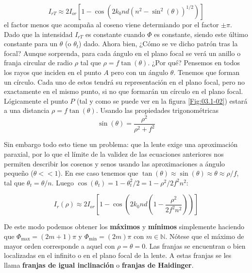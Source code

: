 \documentclass[12pt,a4paper]{book}
\numberwithin{equation}{section}
\numberwithin{figure}{section}
\newcommand{\parentesis}[1]{\left( #1  \right)}
\newcommand{\ccorchetes}[1]{\left[ #1  \right]}
\newcommand{\1}{_{(1)}}
\newcommand{\2}{_{(2)}}
\theoremstyle{definition}
\begin{document}
\begin{equation}
I_{rT} \approx 2I_{or} \ccorchetes{1-\cos \parentesis{2k_0 n d (n^2-\sin^2(\theta))^{1/2}}} \label{Ec:03.1-4}
\end{equation}
el factor menos que acompaña al coseno viene determiando por el factor $\pm \pi$. Dado que la intensidad $I_{rT}$ es constante cuando $\Phi$ es constante, siendo este último constante para un $\theta$ (o $\theta_t$) dado. Ahora bien, ¿Cómo se ve dicho patrón tras la focal? Aunque sorprenda, para cada ángulo en el plano focal se verá un anillo o franja circular de radio $\rho$ tal que $\rho =  f \tan (\theta)$. ¿Por qué? Pensemos en todos los rayos que inciden en el punto $A$ pero con un ángulo $\theta$. Tenemos que forman un círculo. Cada uno de estos tendrá su representación en el plano focal, pero no exactamente en el mismo punto, si no que formarán un círculo en el plano focal. Lógicamente el punto $P$ (tal y como se puede ver en la figura \ref{Fig:03.1-02}) estará a una distancia $\rho=f\tan(\theta)$. Usando las propiedades trigonométricas \\

\begin{equation}
\sin (\theta) = \frac{\rho^2}{\rho^2 + f^2}
\end{equation}


Sin embargo todo esto tiene un problema: que la lente exige una aproximación paraxial, por lo que el límite de la validez de las ecuaciones anteriores nos permiten describir los cosenos y senos usando las aproximaciones a ángulo pequeño ($\theta<<1$). En ese caso tenemos que $\tan(\theta) \approx \sin (\theta) \approx \theta \approx \rho/f$, tal que $\theta_t = \theta/n$. Luego $\cos (\theta_t) = 1-\theta_t^2/2 = 1 - \rho^2 / 2 f^2 n^2$:

\begin{equation}
I_{r} (\rho) \approx 2 I_{or} \ccorchetes{1- \cos \parentesis{2k_0 n d \parentesis{1- \frac{\rho^2}{2 f^2 n^2}}}}
\end{equation}

De este modo podemos obtener los \textbf{máximos} y \textbf{mínimos} simplemente haciendo que $\Phi_{\max}=(2m+1)\pi$ y $\Phi_{\min}= (2m)\pi$ con $m\in \mathbb{N}$. Nótese que el máximo de mayor orden corresponde a aquel con $\rho=\theta=0$. Las franjas se encuentran o bien localizadas en el infinito o en el plano focal de la lente. A estas franjas se les llama \textbf{franjas de igual inclinación} o \textbf{franjas de Haidinger}. \\
\end{document}
